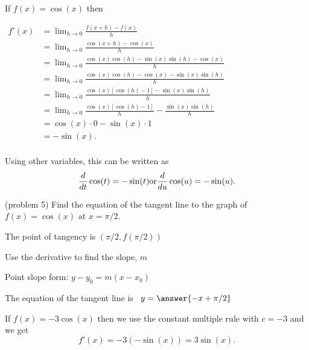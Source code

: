 \documentclass[handout]{ximera}
\begin{document}
\begin{explanation}
If $f(x) = \cos(x)$ then\\
\begin{center}
$\begin{aligned}
f'(x) &= \lim_{h \to 0} \frac{f(x+h)-f(x)}{h} \\[5pt]
&= \lim_{h \to 0} \frac{\cos(x+h) - \cos(x)}{h}\\[5pt]
&=  \lim_{h \to 0} \frac{\cos(x)\cos(h) - \sin(x)\sin(h) - \cos(x)}{h}\\[5pt]
&=  \lim_{h \to 0} \frac{\cos(x)\cos(h) - \cos(x) - \sin(x)\sin(h)}{h}\\[5pt]
&=  \lim_{h \to 0} \frac{\cos(x)[\cos(h) -1] - \sin(x)\sin(h)}{h}\\[5pt]
&=  \lim_{h \to 0} \frac{\cos(x)[\cos(h) -1]}{h} - \frac{\sin(x)\sin(h)}{h}\\[5pt]
&=   \cos(x) \cdot 0 - \sin(x)\cdot 1\\[5pt]
&= -\sin(x).\\[5pt]
\end{aligned}$
\end{center}
Using other variables, this can be written as
\[
\frac{d}{dt} \cos(t) = -\sin(t) \\
\text{or}\\
\frac{d}{du} \cos(u) = -\sin(u).
\]

\end{explanation}


\begin{problem}(problem 5)
Find the equation of the tangent line to the graph of $f(x) = \cos(x)$ at $x=\pi/2.$


\begin{hint}
The point of tangency is $(\pi/2, f(\pi/2))$
\end{hint}
\begin{hint}
Use the derivative to find the slope, $m$
\end{hint}
\begin{hint}
Point slope form: $y-y_0 = m(x-x_0)$
\end{hint}

The equation of the tangent line is \ $y = \answer{-x + \pi/2}$

\end{problem}


\begin{example}[example 6]
 If $f(x) = -3\cos(x)$ then we use the constant multiple rule with $c = -3$ and we get 
\[
f'(x) = -3(-\sin(x)) = 3\sin(x).
\]
\end{example}
\end{document}
